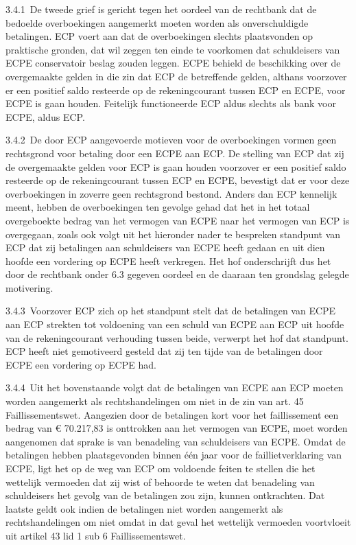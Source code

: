 \documentclass[
  dutch,
  a4paper,
]{article}
\begin{document}
3.4.1 De tweede grief is gericht tegen het oordeel van de rechtbank dat de bedoelde overboekingen aangemerkt moeten worden als onverschuldigde betalingen. ECP voert aan dat de overboekingen slechts plaatsvonden op praktische gronden, dat wil zeggen ten einde te voorkomen dat schuldeisers van ECPE conservatoir beslag zouden leggen. ECPE behield de beschikking over de overgemaakte gelden in die zin dat ECP de betreffende gelden, althans voorzover er een positief saldo resteerde op de rekeningcourant tussen ECP en ECPE, voor ECPE is gaan houden. Feitelijk functioneerde ECP aldus slechts als bank voor ECPE, aldus ECP.

3.4.2 De door ECP aangevoerde motieven voor de overboekingen vormen geen rechtsgrond voor betaling door een ECPE aan ECP. De stelling van ECP dat zij de overgemaakte gelden voor ECP is gaan houden voorzover er een positief saldo resteerde op de rekeningcourant tussen ECP en ECPE, bevestigt dat er voor deze overboekingen in zoverre geen rechtsgrond bestond. Anders dan ECP kennelijk meent, hebben de overboekingen ten gevolge gehad dat het in het totaal overgeboekte bedrag van het vermogen van ECPE naar het vermogen van ECP is overgegaan, zoals ook volgt uit het hieronder nader te bespreken standpunt van ECP dat zij betalingen aan schuldeisers van ECPE heeft gedaan en uit dien hoofde een vordering op ECPE heeft verkregen. Het hof onderschrijft dus het door de rechtbank onder 6.3 gegeven oordeel en de daaraan ten grondslag gelegde motivering.

3.4.3 Voorzover ECP zich op het standpunt stelt dat de betalingen van ECPE aan ECP strekten tot voldoening van een schuld van ECPE aan ECP uit hoofde van de rekeningcourant verhouding tussen beide, verwerpt het hof dat standpunt. ECP heeft niet gemotiveerd gesteld dat zij ten tijde van de betalingen door ECPE een vordering op ECPE had.

3.4.4 Uit het bovenstaande volgt dat de betalingen van ECPE aan ECP moeten worden aangemerkt als rechtshandelingen om niet in de zin van art. 45 Faillissementswet. Aangezien door de betalingen kort voor het faillissement een bedrag van € 70.217,83 is onttrokken aan het vermogen van ECPE, moet worden aangenomen dat sprake is van benadeling van schuldeisers van ECPE. Omdat de betalingen hebben plaatsgevonden binnen één jaar voor de faillietverklaring van ECPE, ligt het op de weg van ECP om voldoende feiten te stellen die het wettelijk vermoeden dat zij wist of behoorde te weten dat benadeling van schuldeisers het gevolg van de betalingen zou zijn, kunnen ontkrachten. Dat laatste geldt ook indien de betalingen niet worden aangemerkt als rechtshandelingen om niet omdat in dat geval het wettelijk vermoeden voortvloeit uit artikel 43 lid 1 sub 6 Faillissementswet.
\end{document}
